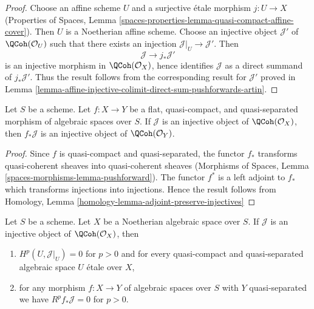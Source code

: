 \begin{proof}
Choose an affine scheme $U$ and a surjective \'etale morphism
$j : U \to X$ (Properties of Spaces, Lemma
\ref{spaces-properties-lemma-quasi-compact-affine-cover}).
Then $U$ is a Noetherian affine scheme. Choose an injective object
$\mathcal{J}'$ of $\QCoh(\mathcal{O}_U)$ such that there
exists an injection $\mathcal{J}|_U \to \mathcal{J}'$. Then
$$
\mathcal{J} \to j_*\mathcal{J}'
$$
is an injective morphism in $\QCoh(\mathcal{O}_X)$,
hence identifies $\mathcal{J}$ as a direct summand of $j_*\mathcal{J}'$.
Thus the result follows from the corresponding result for
$\mathcal{J}'$ proved in
Lemma \ref{lemma-affine-injective-colimit-direct-sum-pushforwards-artin}.
\end{proof}

\begin{lemma}
\label{lemma-flat-pullback-injective-quasi-coherent}
Let $S$ be a scheme. Let $f : X \to Y$ be a flat, quasi-compact, and
quasi-separated morphism of algebraic spaces over $S$. If
$\mathcal{J}$ is an injective object of $\QCoh(\mathcal{O}_X)$,
then $f_*\mathcal{J}$ is an injective object of
$\QCoh(\mathcal{O}_Y)$.
\end{lemma}

\begin{proof}
Since $f$ is quasi-compact and quasi-separated, the functor
$f_*$ transforms quasi-coherent sheaves into quasi-coherent sheaves
(Morphisms of Spaces, Lemma \ref{spaces-morphisms-lemma-pushforward}).
The functor $f^*$ is a left adjoint to $f_*$ which
transforms injections into injections.
Hence the result follows from
Homology, Lemma \ref{homology-lemma-adjoint-preserve-injectives}
\end{proof}

\begin{lemma}
\label{lemma-injective-pushforward}
Let $S$ be a scheme. Let $X$ be a Noetherian algebraic space over $S$. If
$\mathcal{J}$ is an injective object of $\QCoh(\mathcal{O}_X)$,
then
\begin{enumerate}
\item $H^p(U, \mathcal{J}|_U) = 0$ for $p > 0$ and for
every quasi-compact and quasi-separated algebraic space $U$ \'etale over $X$,
\item for any morphism $f : X \to Y$ of algebraic spaces over $S$
with $Y$ quasi-separated we have $R^pf_*\mathcal{J} = 0$ for $p > 0$.
\end{enumerate}
\end{lemma}

